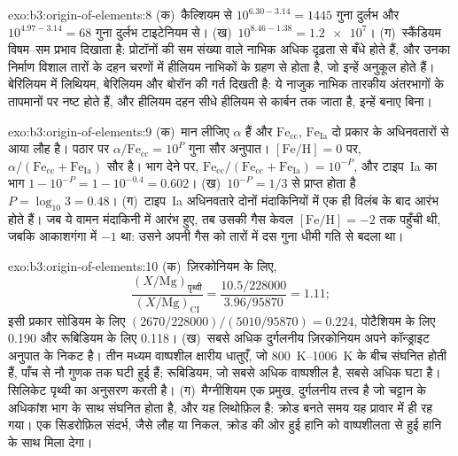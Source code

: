 \begin{solution}{exo:b3:origin-of-elements:8}
(क)~कैल्शियम से $10^{6.30 - 3.14} = 1445$ गुना दुर्लभ और
$10^{4.97 - 3.14} = 68$ गुना दुर्लभ टाइटेनियम से। (ख)~$10^{8.46 - 1.38}
= \num{1.2e7}$। (ग)~स्कैंडियम विषम--सम प्रभाव दिखाता है: प्रोटॉनों की सम संख्या
वाले नाभिक अधिक दृढ़ता से बँधे होते हैं, और उनका निर्माण विशाल तारों के दहन चरणों में
हीलियम नाभिकों के ग्रहण से होता है, जो
इन्हें अनुकूल होते हैं। बेरिलियम में लिथियम, बेरिलियम और बोरॉन की गर्त दिखती है:
ये नाजुक नाभिक तारकीय अंतरभागों के तापमानों पर नष्ट होते हैं, और
हीलियम दहन सीधे हीलियम से कार्बन तक जाता है,
इन्हें बनाए बिना।
\end{solution}

\begin{solution}{exo:b3:origin-of-elements:9}
(क)~मान लीजिए $\alpha$  हैं और $\mathrm{Fe}_\mathrm{cc}$,
$\mathrm{Fe}_\mathrm{Ia}$ दो प्रकार के अधिनवतारों से आया लौह है। पठार पर
$\alpha/\mathrm{Fe}_\mathrm{cc} = 10^{P}$ गुना सौर
अनुपात। $[\mathrm{Fe/H}] = 0$ पर, $\alpha/(\mathrm{Fe}_\mathrm{cc} +
\mathrm{Fe}_\mathrm{Ia})$ सौर है। भाग देने पर,
$\mathrm{Fe}_\mathrm{cc}/(\mathrm{Fe}_\mathrm{cc} + \mathrm{Fe}_\mathrm{Ia})
= 10^{-P}$, और टाइप~Ia का भाग $1 - 10^{-P} = 1 - 10^{-0.4} =
\num{0.602}$। (ख)~$10^{-P} = 1/3$ से प्राप्त होता है $P = \log_{10}3 = 0.48$।
(ग)~टाइप~Ia अधिनवतारे दोनों मंदाकिनियों में एक ही विलंब के बाद आरंभ होते हैं।
जब ये वामन मंदाकिनी में आरंभ हुए, तब उसकी गैस केवल
$[\mathrm{Fe/H}] = -2$ तक पहुँची थी, जबकि आकाशगंगा में $-1$ था: उसने अपनी गैस को
तारों में दस गुना धीमी गति से बदला था।
\end{solution}

\begin{solution}{exo:b3:origin-of-elements:10}
(क)~ज़िरकोनियम के लिए,
\[
\frac{(X/\mathrm{Mg})_\text{पृथ्वी}}{(X/\mathrm{Mg})_\mathrm{CI}} =
\frac{10.5/228000}{3.96/95870} = 1.11 ;
\]
इसी प्रकार सोडियम के लिए $(2670/228000)/(5010/95870) = 0.224$,
पोटैशियम के लिए \num{0.190} और रूबिडियम के लिए \num{0.118}। (ख)~सबसे अधिक दुर्गलनीय ज़िरकोनियम
अपने कॉन्ड्राइट अनुपात के निकट है। तीन मध्यम वाष्पशील
क्षारीय धातुएँ, जो \qtyrange{800}{1006}{K} के बीच संघनित होती हैं, पाँच से नौ गुणक
तक घटी हुई हैं; रूबिडियम, जो सबसे अधिक वाष्पशील है, सबसे अधिक घटा है। सिलिकेट पृथ्वी
 का अनुसरण करती है। (ग)~मैग्नीशियम एक प्रमुख,
दुर्गलनीय तत्त्व है जो चट्टान के अधिकांश भाग के साथ संघनित होता है, और यह
लिथोफ़िल है: क्रोड बनते समय यह प्रावार में ही रह गया। एक सिडरोफ़िल
संदर्भ, जैसे लौह या निकल, क्रोड की ओर हुई हानि को
वाष्पशीलता से हुई हानि के साथ मिला देगा।
\end{solution}

